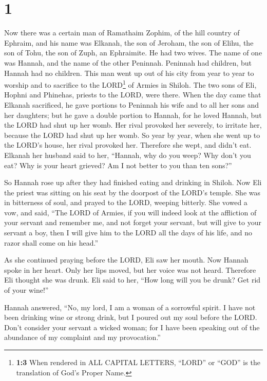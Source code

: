 \hypertarget{section}{%
\section{1}\label{section}}

 Now there was a certain man of Ramathaim Zophim, of the
hill country of Ephraim, and his name was Elkanah, the son of Jeroham,
the son of Elihu, the son of Tohu, the son of Zuph, an Ephraimite.
 He had two wives. The name of one was Hannah, and the
name of the other Peninnah. Peninnah had children, but Hannah had no
children.  This man went up out of his city from year to
year to worship and to sacrifice to the LORD\footnote{\textbf{1:3} When
  rendered in ALL CAPITAL LETTERS, ``LORD'' or ``GOD'' is the
  translation of God's Proper Name.} of Armies in Shiloh. The two sons
of Eli, Hophni and Phinehas, priests to the LORD, were there.
 When the day came that Elkanah sacrificed, he gave
portions to Peninnah his wife and to all her sons and her daughters;
 but he gave a double portion to Hannah, for he loved
Hannah, but the LORD had shut up her womb.  Her rival
provoked her severely, to irritate her, because the LORD had shut up her
womb.  So year by year, when she went up to the LORD's
house, her rival provoked her. Therefore she wept, and didn't eat.
 Elkanah her husband said to her, ``Hannah, why do you
weep? Why don't you eat? Why is your heart grieved? Am I not better to
you than ten sons?''

 So Hannah rose up after they had finished eating and
drinking in Shiloh. Now Eli the priest was sitting on his seat by the
doorpost of the LORD's temple.  She was in bitterness of
soul, and prayed to the LORD, weeping bitterly.  She
vowed a vow, and said, ``The LORD of Armies, if you will indeed look at
the affliction of your servant and remember me, and not forget your
servant, but will give to your servant a boy, then I will give him to
the LORD all the days of his life, and no razor shall come on his
head.''

 As she continued praying before the LORD, Eli saw her
mouth.  Now Hannah spoke in her heart. Only her lips
moved, but her voice was not heard. Therefore Eli thought she was drunk.
 Eli said to her, ``How long will you be drunk? Get rid
of your wine!''

 Hannah answered, ``No, my lord, I am a woman of a
sorrowful spirit. I have not been drinking wine or strong drink, but I
poured out my soul before the LORD.  Don't consider your
servant a wicked woman; for I have been speaking out of the abundance of
my complaint and my provocation.''

